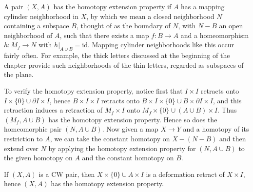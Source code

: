 \begin{example}
\label{ex:mapping-cylinder-neighborhood-hep}
A pair $(X,A)$ has the homotopy extension property if $A$ has a mapping cylinder
neighborhood in $X$, by which we mean a closed neighborhood $N$ containing a
subspace $B$, thought of as the boundary of $N$, with $N - B$ an open neighborhood
of $A$, such that there exists a map $f : B \to A$ and a homeomorphism $h : M_f \to N$
with $h|_{A \cup B} = \text{id}$. Mapping cylinder neighborhoods like this occur fairly often.
For example, the thick letters discussed at the beginning of the chapter provide such
neighborhoods of the thin letters, regarded as subspaces of the plane.

To verify the homotopy extension property, notice first that $I \times I$ retracts onto
$I \times \{0\} \cup \partial I \times I$, hence $B \times I \times I$ retracts onto
$B \times I \times \{0\} \cup B \times \partial I \times I$, and this retraction induces a retraction of
$M_f \times I$ onto $M_f \times \{0\} \cup (A \cup B) \times I$. Thus $(M_f, A \cup B)$ has the
homotopy extension property. Hence so does the homeomorphic pair $(N, A \cup B)$.
Now given a map $X \to Y$ and a homotopy of its restriction to $A$, we can take the
constant homotopy on $X - (N-B)$ and then extend over $N$ by applying the
homotopy extension property for $(N, A \cup B)$ to the given homotopy on $A$ and the
constant homotopy on $B$.


\end{example}

\begin{proposition}
\label{prop:cw-pairs-have-hep}
If $(X,A)$ is a CW pair, then $X \times \{0\} \cup A \times I$ is a deformation retract of
$X \times I$, hence $(X,A)$ has the homotopy extension property.
\end{proposition}

